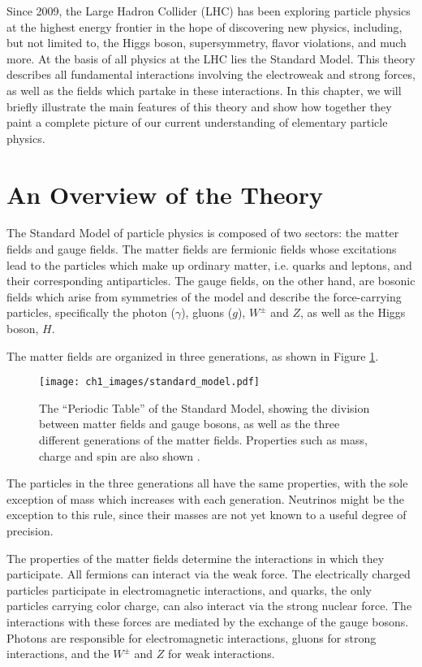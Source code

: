 \documentclass[10pt,a4paper]{book}
\begin{document}
Since 2009, the Large Hadron Collider (LHC) has been exploring particle physics at the highest energy frontier in the hope of discovering new physics, including, but not limited to, the Higgs boson, supersymmetry, flavor violations, and much more. At the basis of all physics at the LHC lies the Standard Model. This theory describes all fundamental interactions involving the electroweak and strong forces, as well as the fields which partake in these interactions. In this chapter, we will briefly illustrate the main features of this theory and show how together they paint a complete picture of our current understanding of elementary particle physics.



\section{An Overview of the Theory}
The Standard Model of particle physics is composed of two sectors: the matter fields and gauge fields. The matter fields are fermionic fields whose excitations lead to the particles which make up ordinary matter, i.e. quarks and leptons, and their corresponding antiparticles. The gauge fields, on the other hand, are bosonic fields which arise from symmetries of the model and describe the force-carrying particles, specifically the photon ($\gamma$), gluons ($g$), $W^{\pm}$ and $Z$, as well as the Higgs boson, $H$.

The matter fields are organized in three generations, as shown in Figure \ref{Standard Model particles}.
\begin{figure}
\centering
\texttt{[image: ch1\_images/standard\_model.pdf]}
\caption{The ``Periodic Table'' of the Standard Model, showing the division between matter fields and gauge bosons, as well as the three different generations of the matter fields. Properties such as mass, charge and spin are also shown \cite{sm_particles}.}
\label{Standard Model particles}
\end{figure}
The particles in the three generations all have the same properties, with the sole exception of mass which increases with each generation. Neutrinos might be the exception to this rule, since their masses are not yet known to a useful degree of precision. 

The properties of the matter fields determine the interactions in which they participate. All fermions can interact via the weak force. The electrically charged particles participate in electromagnetic interactions, and quarks, the only particles carrying color charge, can also interact via the strong nuclear force. The interactions with these forces are mediated by the exchange of the gauge bosons. Photons are responsible for electromagnetic interactions, gluons for strong interactions, and the $W^\pm$ and $Z$ for weak interactions. 
\end{document}
